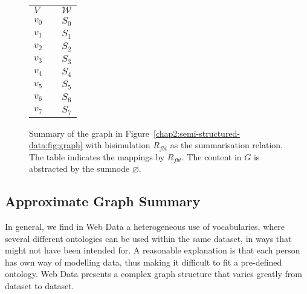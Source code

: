 \begin{figure}
	\centering
	\begin{minipage}{.75\textwidth}
		\resizebox{\textwidth}{!}{
			
		}
	\end{minipage}
	\quad
	\begin{minipage}[h]{.2\textwidth}
		\centering
		\caption*{$R_{fbt}\left(V, \mathcal{W}\right)$}
		\begin{tabular}{lc@{\hs}l}
			\toprule
			$V$ & \phantom{a} & $\mathcal{W}$ \\
			\cmidrule{1-1} \cmidrule{3-3}
			$v_0$ & \phantom{a} & $S_0$ \\
			$v_1$ & \phantom{a} & $S_1$ \\
			$v_2$ & \phantom{a} & $S_2$ \\
			$v_3$ & \phantom{a} & $S_3$ \\
			$v_4$ & \phantom{a} & $S_4$ \\
			$v_5$ & \phantom{a} & $S_5$ \\
			$v_6$ & \phantom{a} & $S_6$ \\
			$v_7$ & \phantom{a} & $S_7$ \\
			\bottomrule
		\end{tabular}
	\end{minipage}
	\caption{Summary of the graph in Figure~\ref{chap2:semi-structured-data:fig:graph} with bisimulation $R_{fbt}$ as the summarisation relation. The table indicates the mappings by $R_{fbt}$. The content in $G$ is abstracted by the sumnode $\varnothing$.}
	\label{chap4:summary:fig:fbb-summary}
\end{figure}

\subsection{Approximate Graph Summary}
\label{sec:approximate}

In general, we find in Web Data a heterogeneous use of vocabularies, where several different ontologies can be used within the same dataset, in ways that might not have been intended for. A reasonable explanation is that each person has own way of modelling data, thus making it difficult to fit a pre-defined ontology. Web Data presents a complex graph structure that varies greatly from dataset to dataset.

